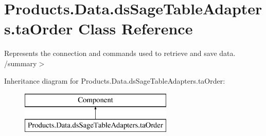 \hypertarget{class_products_1_1_data_1_1ds_sage_table_adapters_1_1ta_order}{}\section{Products.\+Data.\+ds\+Sage\+Table\+Adapters.\+ta\+Order Class Reference}
\label{class_products_1_1_data_1_1ds_sage_table_adapters_1_1ta_order}


Represents the connection and commands used to retrieve and save data. /summary$>$  


Inheritance diagram for Products.\+Data.\+ds\+Sage\+Table\+Adapters.\+ta\+Order\+:\begin{figure}[H]
\begin{center}
\leavevmode
\includegraphics[height=2.000000cm]{class_products_1_1_data_1_1ds_sage_table_adapters_1_1ta_order}
\end{center}
\end{figure}

